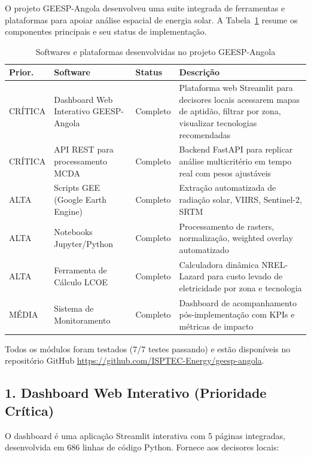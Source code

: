 \documentclass[12pt, a4paper]{article}
\begin{document}
O projeto GEESP-Angola desenvolveu uma suite integrada de ferramentas e plataformas para apoiar análise espacial de energia solar. A Tabela~\ref{tab:softwares} resume os componentes principais e seu status de implementação.

\begin{table}[H]
\centering
\small
\caption{Softwares e plataformas desenvolvidas no projeto GEESP-Angola}
\label{tab:softwares}
\begin{tabular}{|l|l|l|p{5.5cm}|}
\hline
\textbf{Prior.} & \textbf{Software} & \textbf{Status} & \textbf{Descrição} \\
\hline
CRÍTICA & Dashboard Web Interativo GEESP-Angola & Completo & Plataforma web Streamlit para decisores locais acessarem mapas de aptidão, filtrar por zona, visualizar tecnologias recomendadas \\
\hline
CRÍTICA & API REST para processamento MCDA & Completo & Backend FastAPI para replicar análise multicritério em tempo real com pesos ajustáveis \\
\hline
ALTA & Scripts GEE (Google Earth Engine) & Completo & Extração automatizada de radiação solar, VIIRS, Sentinel-2, SRTM \\
\hline
ALTA & Notebooks Jupyter/Python & Completo & Processamento de rasters, normalização, weighted overlay automatizado \\
\hline
ALTA & Ferramenta de Cálculo LCOE & Completo & Calculadora dinâmica NREL-Lazard para custo levado de eletricidade por zona e tecnologia \\
\hline
MÉDIA & Sistema de Monitoramento & Completo & Dashboard de acompanhamento pós-implementação com KPIs e métricas de impacto \\
\hline
\end{tabular}
\end{table}

Todos os módulos foram testados (7/7 testes passando) e estão disponíveis no repositório GitHub \url{https://github.com/ISPTEC-Energy/geesp-angola}.

\subsection{1. Dashboard Web Interativo (Prioridade Crítica)}

O dashboard é uma aplicação Streamlit interativa com 5 páginas integradas, desenvolvida em 686 linhas de código Python. Fornece aos decisores locais:
\end{document}
